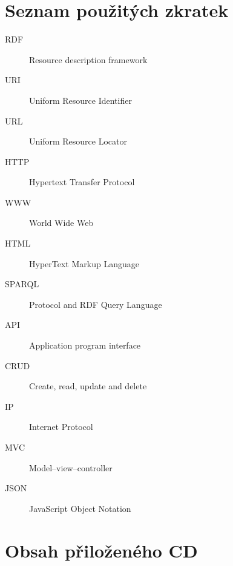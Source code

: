 \documentclass[thesis=B,czech]{FITthesis}[2012/06/26]
\begin{document}
\chapter{Seznam použitých zkratek}
\begin{description}
	\item[RDF] Resource description framework
	\item[URI] Uniform Resource Identifier
	\item[URL] Uniform Resource Locator
	\item[HTTP] Hypertext Transfer Protocol
	\item[WWW] World Wide Web
	\item[HTML] HyperText Markup Language
	\item[SPARQL] Protocol and RDF Query Language
	\item[API] Application program interface
	\item[CRUD] Create, read, update and delete
	\item[IP] Internet Protocol 
	\item[MVC] Model–view–controller
	\item[JSON] JavaScript Object Notation
\end{description}



\chapter{Obsah přiloženého CD}


\begin{figure}
\end{figure}
\end{document}
